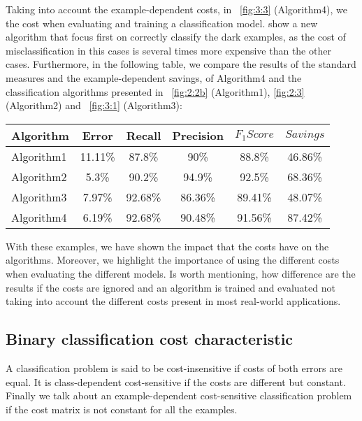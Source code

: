 {{Taking into account the example-dependent costs, in \figurename{~\ref{fig:3:3}} (Algorithm4), we the 
cost when evaluating and training a classification model. show a new algorithm that focus first on 
correctly classify the dark examples, as the cost of misclassification in this cases is several 
times more expensive than the other cases.
Furthermore, in the following table, we compare the results of the standard measures and the 
example-dependent savings, of Algorithm4 and the classification algorithms presented in 
\figurename{~\ref{fig:2:2b}} (Algorithm1), \figurename{ \ref{fig:2:3}} (Algorithm2) and 
\figurename{~\ref{fig:3:1}} (Algorithm3):
\begin{center}
    \footnotesize
  \begin{tabular}{l|c|c|c|c|c}
  Algorithm & Error & Recall & Precision & $F_1Score$ & $Savings$ \\
  \hline
  Algorithm1 & 11.11\% & 87.8\%& 90\%& 88.8\% & 46.86\%\\ %
  Algorithm2 & 5.3\% & 90.2\%& 94.9\%& 92.5\% & 68.36\%\\ %
  Algorithm3 & 7.97\%& 92.68\% &86.36\%& 89.41\% & 48.07\% \\
  Algorithm4 & 6.19\%& 92.68\% &90.48\%& 91.56\% & 87.42\% \\
  \end{tabular}
\end{center}
\vspace{0.3cm}

With these examples, we have shown the impact that the costs have on the algorithms. Moreover, we 
highlight the importance of using the different costs when evaluating the different models. Is 
worth mentioning, how difference are the results if the costs are ignored and an algorithm is 
trained and evaluated not taking into account the different costs present in most real-world 
applications.

  
\subsection{Binary classification cost characteristic}
\label{sec:3:cost_characteristic}  

  A classification problem is said to be cost-insensitive if costs of both errors are equal. It 
  is class-dependent cost-sensitive if the costs are different but constant. Finally we talk 
  about an example-dependent cost-sensitive classification problem if the cost matrix is not 
  constant for all the examples.

}}
